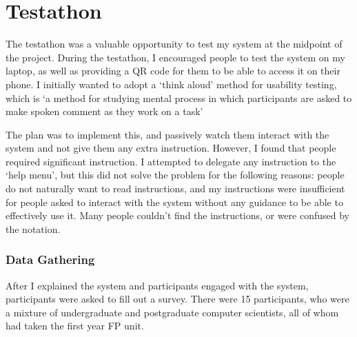 \section{Testathon}
The testathon was a valuable opportunity to test my system at the midpoint of the project. During the testathon, I encouraged people to test the system on my laptop, as well as providing a QR code for them to be able to access it on their phone. I initially wanted to adopt a `think aloud' method for usability testing, which is `a method for studying mental process in which participants are asked to make spoken comment as they work on a task'\cite{thinkaloud}

The plan was to implement this, and passively watch them interact with the system and not give them any extra instruction. However, I found that people required significant instruction. I attempted to delegate any instruction to the `help menu', but this did not solve the problem for the following reasons: people do not naturally want to read instructions, and my instructions were insufficient for people asked to interact with the system without any guidance to be able to effectively use it. Many people couldn't find the instructions, or were confused by the notation.

\subsubsection{Data Gathering}
After I explained the system and participants engaged with the system, participants were asked to fill out a survey. There were 15 participants, who were a mixture of undergraduate and postgraduate computer scientists, all of whom had taken the first year \ac{FP} unit. 


    

